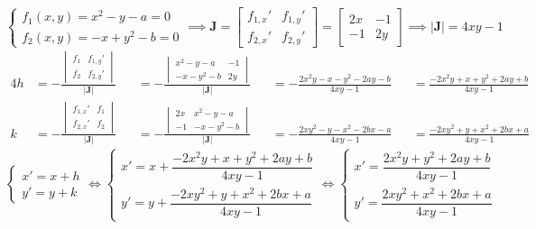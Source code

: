 \begin{equation*}
	\begin{cases}
		f_1(x,y)=x^2-y-a=0\\
		f_2(x,y)=-x+y^2-b=0
	\end{cases}
	\implies
	\mathbf{J}=\begin{bmatrix}
  		f_{1,x}' & f_{1,y}'\\
  		f_{2,x}' & f_{2,y}'
	\end{bmatrix}=\begin{bmatrix}
  		2x & -1\\
  		-1 & 2y
	\end{bmatrix}
	\implies
	|\mathbf{J}|=4xy-1
\end{equation*}
\begin{alignat*}{4}
	h&=-\frac{
		\begin{vmatrix}
			f_1 & f_{1,y}' \\
			f_2 & f_{2,y}'
		\end{vmatrix}}
		{|\mathbf{J}|}
	   &&=-\frac{
		\begin{vmatrix}
			x^2-y-a  & -1 \\
			-x-y^2-b & 2y
		\end{vmatrix}}
		{|\mathbf{J}|}
	   &&=-\frac{2x^2y-x-y^2-2ay-b}{4xy-1}
	   &&=\frac{-2x^2y+x+y^2+2ay+b}{4xy-1} \\
	k&=-\frac{
		\begin{vmatrix}
			f_{1,x}' & f_1 \\
			f_{2,x}' & f_2
		\end{vmatrix}}
		{|\mathbf{J}|}
	   &&=-\frac{
		\begin{vmatrix}
			2x & x^2-y-a \\
			-1 & -x-y^2-b
		\end{vmatrix}}
		{|\mathbf{J}|}
	   &&=-\frac{2xy^2-y-x^2-2bx-a}{4xy-1}
	   &&=\frac{-2xy^2+y+x^2+2bx+a}{4xy-1}
\end{alignat*}
\begin{equation*}
	\begin{cases}
		x'=x+h\\
		y'=y+k
	\end{cases}
	\iff
	\begin{cases}
		x'=x+\dfrac{-2x^2y+x+y^2+2ay+b}{4xy-1}\\[1em]
		y'=y+\dfrac{-2xy^2+y+x^2+2bx+a}{4xy-1}
	\end{cases}
	\iff
	\begin{cases}
		x'=\dfrac{2x^2y+y^2+2ay+b}{4xy-1}\\[1em]
		y'=\dfrac{2xy^2+x^2+2bx+a}{4xy-1}
	\end{cases}
\end{equation*}
